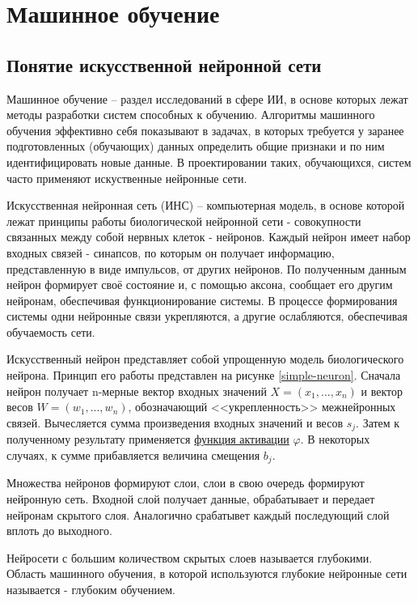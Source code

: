 \section{Машинное обучение} \label{ML}

\subsection{Понятие искусственной нейронной сети}

Машинное обучение – раздел исследований в сфере ИИ, в основе которых лежат методы разработки систем способных к обучению. Алгоритмы машинного обучения эффективно себя показывают в задачах, в которых требуется у заранее подготовленных (обучающих) данных определить общие признаки и по ним идентифицировать новые данные. В проектировании таких, обучающихся, систем часто применяют искуственные нейронные сети. 

Искусственная нейронная сеть (ИНС) – компьютерная модель, в основе которой лежат принципы работы биологической нейронной сети - совокупности связанных между собой нервных клеток - нейронов. Каждый нейрон имеет набор входных связей - синапсов, по которым он получает информацию, представленную в виде импульсов, от других нейронов. По полученным данным нейрон формирует своё состояние и, с помощью аксона, сообщает его другим нейронам, обеспечивая функционирование системы. В процессе формирования системы одни нейронные связи укрепляются, а другие ослабляются, обеспечивая обучаемость сети.

Искусственный нейрон представляет собой упрощенную модель биологического нейрона. Принцип его работы представлен на рисунке \ref{simple-neuron}. Сначала нейрон получает n-мерные вектор входных значений $X=(x_{1},...,x_{n})$ и вектор весов $W=(w_{1},...,w_{n})$, обозначающий <<укрепленность>> межнейронных связей. Вычесляется сумма произведения входных значений и весов $s_j$. Затем к полученному результату применяется \hyperref[sec:activation]{функция активации} $\varphi$. В некоторых случаях, к сумме прибавляется величина смещения $b_j$.


Множества нейронов формируют слои, слои в свою очередь формируют нейронную сеть. Входной слой получает данные, обрабатывает и передает нейронам скрытого слоя. Аналогично срабатывет каждый последующий слой вплоть до выходного. 


Нейросети с большим количеством скрытых слоев называется глубокими. Область машинного обучения, в которой используются глубокие нейронные сети называется - глубоким обучением.     

